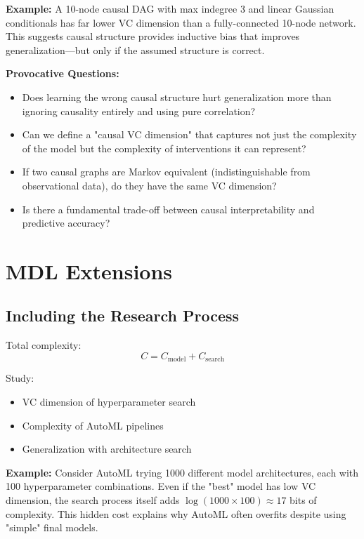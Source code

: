   \textbf{Example:} A 10-node causal DAG with max indegree 3 and linear
  Gaussian conditionals has far lower VC dimension than a fully-connected
  10-node network. This suggests causal structure provides inductive bias
  that improves generalization—but only if the assumed structure is correct.

  \textbf{Provocative Questions:}
  \begin{itemize}
    \item Does learning the wrong causal structure hurt generalization more
      than ignoring causality entirely and using pure correlation?

    \item Can we define a "causal VC dimension" that captures not just the
      complexity of the model but the complexity of interventions it can
      represent?

    \item If two causal graphs are Markov equivalent (indistinguishable
      from observational data), do they have the same VC dimension?

    \item Is there a fundamental trade-off between causal interpretability
      and predictive accuracy?
  \end{itemize}

  \section{MDL Extensions}

  \subsection*{Including the Research Process}

  Total complexity:
  \[
    C = C_{\text{model}}+ C_{\text{search}}
  \]

  Study:
  \begin{itemize}
    \item VC dimension of hyperparameter search

    \item Complexity of AutoML pipelines

    \item Generalization with architecture search
  \end{itemize}

  \textbf{Example:} Consider AutoML trying 1000 different model
  architectures, each with 100 hyperparameter combinations. Even if the
  "best" model has low VC dimension, the search process itself adds $\log
  (1000 \times 100) \approx 17$ bits of complexity. This hidden cost
  explains why AutoML often overfits despite using "simple" final models.

